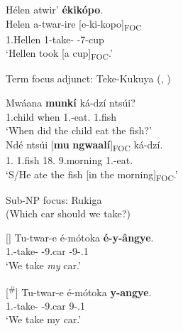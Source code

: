 \documentclass[output=paper]{langscibook}
\begin{document}
\ex
Hélen atwir’ \textbf{ékikópo}.\\
\gll
Helen  a-twar-ire  [e-ki-kopo]\textsubscript{FOC}\\
1.Hellen  1\SM{}-take-\PFV{}  {\db}\AUG-{}7-cup \\
\glt
‘Hellen took [a cup]\textsubscript{FOC}.’\\


\z
\z

\ea
Term focus adjunct: Teke-Kukuya (, \cite{chapters/teke})

\ea
\gll
Mwáana  \textbf{munkí}  ká-dzí  ntsúi?\\
1.child  when  1\SM.\PST{}-eat.\PST{}  1.fish\\
\glt
‘When did the child eat the fish?’\\

\ex
\gll
Ndé  ntsúi  [\textbf{mu}  \textbf{ngwaalí}]\textsubscript{FOC}  ká-dzí.\\
1.\PRO{}  1.fish  {\db}18.\LOC{}  9.morning  1\SM.\PST{}-eat.\PST{}  \\
\glt
‘S/He ate the fish [in the morning]\textsubscript{FOC}.’\\


\z
\z



\ea
Sub-NP focus: Rukiga \citep[1297]{AsiimweEtAl2023}\\
(Which car should we take?)

\ea
[]{
\gll
Tu-twar-e  é-mótoka  \textbf{é-y-ângye}.\\
1\PL.\SM{}-take-\SBJV{}  \AUG{}-9.car  \AUG{}-9-\POSS.1\SG{}\\
\glt
‘We take \textit{my} car.’\\
}

\ex
[\textsuperscript{\#}]{
\gll
Tu-twar-e   é-mótoka  \textbf{y-angye}.\\
1\PL.\SM{}-take-\SBJV{}  \AUG{}-9.car  9-\POSS.1\SG{}\\
\glt
‘We take my car.’\\
}


\z
\z
\end{document}

